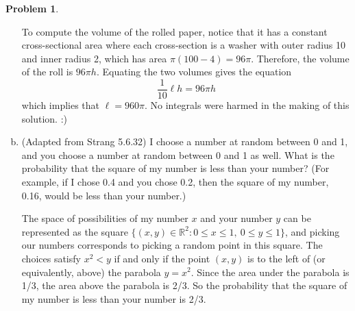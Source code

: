 \documentclass[11pt,oneside]{amsart}
\theoremstyle{definition}
\newtheorem{problem}{Problem}
\newcommand{\bR}{\mathbb{R}}
\begin{document}
\begin{problem}
\begin{enumerate}[(a)]
\begin{solution}
                To compute the volume of the rolled paper, notice that it has a constant cross-sectional area where each cross-section is a washer with outer radius 10 and inner radius 2, which has area $\pi(100-4)=96\pi$. Therefore, the volume of the roll is $96\pi h$. Equating the two volumes gives the equation
                \[\frac 1{10}\ell h=96\pi h\]
                which implies that $\ell=960\pi$. No integrals were harmed in the making of this solution. :)
            \end{solution}

            \item (Adapted from Strang 5.6.32) I choose a number at random between 0 and 1, and you choose a number at random between 0 and 1 as well. What is the probability that the square of my number is less than your number? (For example, if I chose 0.4 and you chose 0.2, then the square of my number, 0.16, would be less than your number.)
            \begin{solution}
                The space of possibilities of my number $x$ and your number $y$ can be represented as the square $\{(x,y)\in\bR^2\colon 0\leq x\leq 1,\ 0\leq y\leq 1\}$, and picking our numbers corresponds to picking a random point in this square. The choices satisfy $x^2<y$ if and only if the point $(x,y)$ is to the left of (or equivalently, above) the parabola $y=x^2$. Since the area under the parabola is 1/3, the area above the parabola is 2/3. So the probability that the square of my number is less than your number is 2/3.
            \end{solution}
        \end{enumerate}
    \end{problem}
\end{document}
